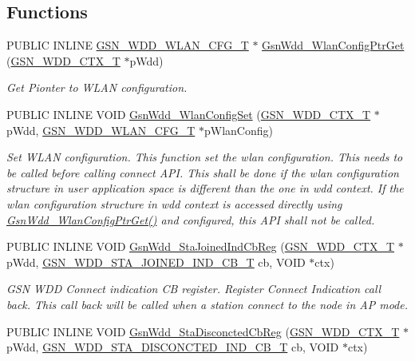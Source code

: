 \subsection*{Functions}
\begin{DoxyCompactItemize}
\item 
PUBLIC INLINE \hyperlink{a00302}{GSN\_\-WDD\_\-WLAN\_\-CFG\_\-T} $\ast$ \hyperlink{a00677_ga7bd1ca2108e05b90c0a173b88a1b08aa}{GsnWdd\_\-WlanConfigPtrGet} (\hyperlink{a00108}{GSN\_\-WDD\_\-CTX\_\-T} $\ast$pWdd)
\begin{DoxyCompactList}\small\item\em Get Pionter to WLAN configuration. \end{DoxyCompactList}\item 
PUBLIC INLINE VOID \hyperlink{a00677_ga0afb07551d3ec00f6b889499fefb1a96}{GsnWdd\_\-WlanConfigSet} (\hyperlink{a00108}{GSN\_\-WDD\_\-CTX\_\-T} $\ast$pWdd, \hyperlink{a00302}{GSN\_\-WDD\_\-WLAN\_\-CFG\_\-T} $\ast$pWlanConfig)
\begin{DoxyCompactList}\small\item\em Set WLAN configuration. This function set the wlan configuration. This needs to be called before calling connect API. This shall be done if the wlan configuration structure in user application space is different than the one in wdd context. If the wlan configuration structure in wdd context is accessed directly using \hyperlink{a00677_ga7bd1ca2108e05b90c0a173b88a1b08aa}{GsnWdd\_\-WlanConfigPtrGet()} and configured, this API shall not be called. \end{DoxyCompactList}\item 
PUBLIC INLINE VOID \hyperlink{a00677_gaca5deb0666cd04eb14805317d1101bf1}{GsnWdd\_\-StaJoinedIndCbReg} (\hyperlink{a00108}{GSN\_\-WDD\_\-CTX\_\-T} $\ast$pWdd, \hyperlink{a00677_ga607917e8bad21deeb1564d9455d46f28}{GSN\_\-WDD\_\-STA\_\-JOINED\_\-IND\_\-CB\_\-T} cb, VOID $\ast$ctx)
\begin{DoxyCompactList}\small\item\em GSN WDD Connect indication CB register. Register Connect Indication call back. This call back will be called when a station connect to the node in AP mode. \end{DoxyCompactList}\item 
PUBLIC INLINE VOID \hyperlink{a00677_ga9f2e2b404dd8b31a46467746abd87d5f}{GsnWdd\_\-StaDisconctedCbReg} (\hyperlink{a00108}{GSN\_\-WDD\_\-CTX\_\-T} $\ast$pWdd, \hyperlink{a00677_ga3a4ef614815eaa2e3085c2d168a1ced5}{GSN\_\-WDD\_\-STA\_\-DISCONCTED\_\-IND\_\-CB\_\-T} cb, VOID $\ast$ctx)

\end{DoxyCompactItemize}
